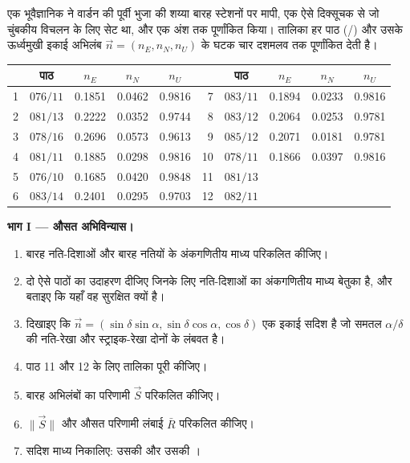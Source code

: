 \begin{problem}
\label{pb:b1:field-lab-methods-1:1}
एक भूवैज्ञानिक ने वार्डन  की पूर्वी भुजा की शय्या बारह स्टेशनों पर मापी, एक ऐसे दिक्सूचक से जो चुंबकीय
विचलन के लिए सेट था, और एक अंश तक पूर्णांकित किया। तालिका हर पाठ (/) और उसके ऊर्ध्वमुखी इकाई
अभिलंब $\vec n = (n_E, n_N, n_U)$ के घटक चार दशमलव तक पूर्णांकित देती है।
\begin{center}
\small
\begin{tabular}{rcccc@{\qquad}rcccc}
\hline
 & पाठ & $n_E$ & $n_N$ & $n_U$ & & पाठ & $n_E$ & $n_N$ & $n_U$ \\
\hline
1 & $076/11$ & 0.1851 & 0.0462 & 0.9816 & 7 & $083/11$ & 0.1894 & 0.0233 & 0.9816 \\
2 & $081/13$ & 0.2222 & 0.0352 & 0.9744 & 8 & $083/12$ & 0.2064 & 0.0253 & 0.9781 \\
3 & $078/16$ & 0.2696 & 0.0573 & 0.9613 & 9 & $085/12$ & 0.2071 & 0.0181 & 0.9781 \\
4 & $081/11$ & 0.1885 & 0.0298 & 0.9816 & 10 & $078/11$ & 0.1866 & 0.0397 & 0.9816 \\
5 & $076/10$ & 0.1685 & 0.0420 & 0.9848 & 11 & $081/13$ & & & \\
6 & $083/14$ & 0.2401 & 0.0295 & 0.9703 & 12 & $082/11$ & & & \\
\hline
\end{tabular}
\end{center}

\medskip
\noindent\textbf{भाग I --- औसत अभिविन्यास।}
\begin{enumerate}
  \item बारह नति-दिशाओं और बारह नतियों के अंकगणितीय माध्य परिकलित कीजिए।
  \item दो ऐसे पाठों का उदाहरण दीजिए जिनके लिए नति-दिशाओं का अंकगणितीय माध्य बेतुका है, और बताइए कि यहाँ वह सुरक्षित क्यों है।
  \item दिखाइए कि $\vec n = (\sin\delta\sin\alpha, \sin\delta\cos\alpha,
        \cos\delta)$ एक इकाई सदिश है जो समतल $\alpha/\delta$ की नति-रेखा और स्ट्राइक-रेखा दोनों के लंबवत है।
  \item पाठ 11 और 12 के लिए तालिका पूरी कीजिए।
  \item बारह अभिलंबों का परिणामी $\vec S$ परिकलित कीजिए।
  \item $\|\vec S\|$ और औसत परिणामी लंबाई $\bar R$ परिकलित कीजिए।
  \item सदिश माध्य निकालिए: उसकी  और उसकी ।
\end{enumerate}


\end{problem}
